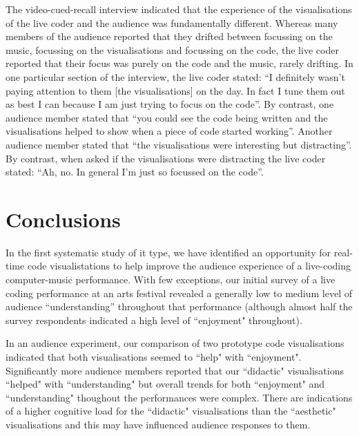 \documentclass{sig-alternate}
\begin{document}
The video-cued-recall interview indicated that the experience of the visualisations of the live coder and the  audience was fundamentally different. Whereas many members of the audience reported that they drifted between focussing on the music, focussing on the visualisations and focussing on the code, the live coder reported that their focus was  purely on the code and the music, rarely drifting. In one particular section of the interview, the live coder stated: ``I definitely wasn't paying attention to them [the visualisations] on the day. In fact I tune them out as best I can because I am just trying to focus on the code''. By contrast, one audience member stated that ``you could see the code being written and the visualisations helped to show when a piece of code started working''. Another audience member stated that ``the visualisations were interesting but distracting''. By contrast, when asked if the visualisations were distracting the live coder stated: ``Ah, no. In general I'm just so focussed on the code''. 

\section{Conclusions}

In the first systematic study of it type, we have identified an opportunity for real-time code visualistations to help improve the audience experience of a live-coding computer-music performance. With few exceptions, our initial survey of a live coding performance at an arts festival revealed a generally low to medium level of audience ``understanding'' throughout that performance (although almost half the survey respondents indicated a high level of ``enjoyment" throughout).

In an audience experiment, our comparison of two prototype code visualisations indicated that both visualisations seemed to ``help" with ``enjoyment". Significantly more audience members reported that our ``didactic" visualisations ``helped" with ``understanding" but overall trends for both ``enjoyment" and ``understanding" thoughout the performances were complex. There are indications of a higher cognitive load for the ``didactic" visualisations than the ``aesthetic" visualisations and this may have influenced audience responses to them. 



\end{document}
